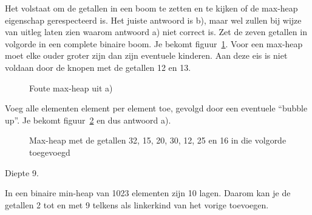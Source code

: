 \begin{Oplossing}{6.1}
Het volstaat om de getallen in een boom te zetten en te kijken of de max-heap eigenschap gerespecteerd is. Het juiste antwoord is b), maar wel zullen bij wijze van uitleg laten zien waarom antwoord a) niet correct is. Zet de zeven getallen in volgorde in een complete binaire boom. Je bekomt figuur~\ref{fig:foutemaxheap}. Voor een max-heap moet elke ouder groter zijn dan zijn eventuele kinderen. Aan deze eis is niet voldaan door de knopen met de getallen 12 en 13.
\begin{figure}[htbp]
    \centering
{}
\caption{Foute max-heap uit a)}
    \label{fig:foutemaxheap}
\end{figure}
\end{Oplossing}
\begin{Oplossing}{6.2}
Voeg alle elementen element per element toe, gevolgd door een eventuele “bubble up”. Je bekomt figuur~\ref{fig:maxheapbubbleup} en dus antwoord a).
\begin{figure}[htbp]
    \centering
{}
\caption{Max-heap met de getallen 32, 15, 20, 30, 12, 25 en 16 in die volgorde toegevoegd}
    \label{fig:maxheapbubbleup}
\end{figure}
\end{Oplossing}
\begin{Oplossing}{6.3}
Diepte 9.

In een binaire min-heap van 1023 elementen zijn 10 lagen. Daarom kan je de getallen 2 tot en met 9 telkens als linkerkind van het vorige toevoegen.
\end{Oplossing}
